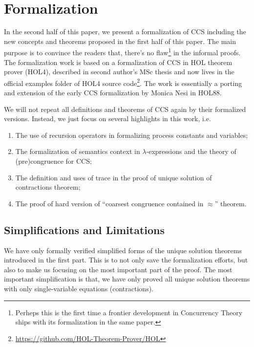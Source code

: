 
\section{Formalization}

In the second half of this paper, we present a formalization of CCS
including the new concepts and theorems proposed in the first half of
this paper. The main purpose is to convince the readers that, there's no flaw\footnote{Perheps this is the first
  time a frontier development in Concurrency Theory ships with its
  formalization in the same paper.} in the informal proofs. The
formalization work is based on a formalization of CCS in HOL theorem
prover (HOL4), described in second author's MSc thesis
\cite{Chun:2017} and now lives in the official examples folder of HOL4 source
code\footnote{\url{https://github.com/HOL-Theorem-Prover/HOL}}.
The work is essentially a porting and extension of the early CCS
formalization by Monica Nesi \cite{Nesi} in HOL88.

We will not repeat all definitions and theorems of CCS again by their
formalized versions. Instead, we just focus on several highlights in
this work, i.e.
\begin{enumerate}
\item The use of recursion operators in formalizing process constants
  and variables;
\item The formalization of semantics context in $\lambda$-expressions and the theory of
  (pre)congruence for CCS;
\item The definition and uses of trace in the proof of unique solution of
  contractions theorem;
\item The proof of hard version of ``coarsest congruence
  contained in $\approx$'' theorem.
\end{enumerate}

\subsection{Simplifications and Limitations}

We have only formally verified simplified forms of the unique
solution theorems introduced in the first part. This is to not only
save the formalization efforts, but also to make us focusing on the most
important part of the proof. The most important simplification is
that, we have only proved all unique solution theorems with only single-variable equations
(contractions).

